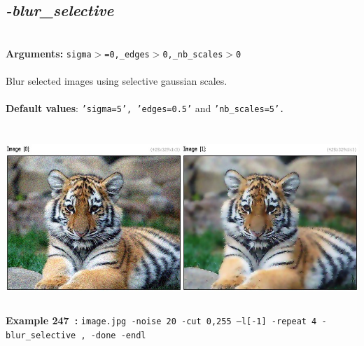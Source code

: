 \documentclass[a4paper,11pt,twoside]{book}
\begin{document}
\subsection{\emph{-blur\_selective} }\vspace*{-0.5em}
~\\\textbf{Arguments: } 
{\small \texttt{sigma$>$=0,\_edges$>$0,\_nb\_scales$>$0}}\\~\\
Blur selected images using selective gaussian scales.
~\\~\\\textbf{Default values}: {\small \texttt{'sigma=5', 'edges=0.5'} and \texttt{'nb\_scales=5'.}}
\begin{center}\includegraphics[keepaspectratio=true,height=7cm,width=\textwidth]{img/gmic_def247.jpg}\\
{\footnotesize \textbf{Example 247~:} \texttt{image.jpg -noise 20 -cut 0,255 --l[-1] -repeat 4 -blur\_selective , -done -endl}}
\end{center}
\end{document}
